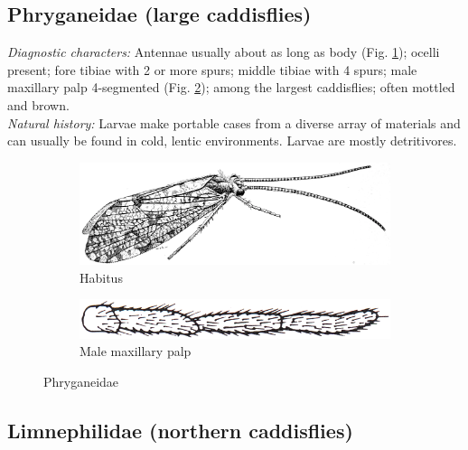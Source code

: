 \documentclass[letterpaper, 11pt]{article}
\begin{document}
\subsection{Phryganeidae (large caddisflies)}
\noindent{}\textit{Diagnostic characters:} Antennae usually about as long as body (Fig. \ref{fig:phrygan1}); ocelli present; fore tibiae with 2 or more spurs; middle tibiae with 4 spurs; male maxillary palp 4-segmented (Fig. \ref{fig:phrygan2}); among the largest caddisflies; often mottled and brown.\\

\noindent{}\textit{Natural history:} Larvae make portable cases from a diverse array of materials and can usually be found in cold, lentic environments. Larvae are mostly detritivores.

\begin{figure}[ht!]
    \centering
    \begin{subfigure}[ht!]{0.68\textwidth}
        \includegraphics[width=\textwidth]{PhryganeidHabitus}
        \caption{Habitus \citep[][Fig. 591]{bhl50956}}
        \label{fig:phrygan1}
    \end{subfigure}
    \hfill %
    \begin{subfigure}[ht!]{0.25\textwidth}
        \includegraphics[width=\textwidth]{TrichoImage01}
        \caption{Male maxillary palp \citep[][Fig. 64]{bhl50956}}
        \label{fig:phrygan2}
    \end{subfigure}
    \caption{Phryganeidae}\label{fig:phrygan}
\end{figure}

\subsection{Limnephilidae (northern caddisflies)}
\end{document}
